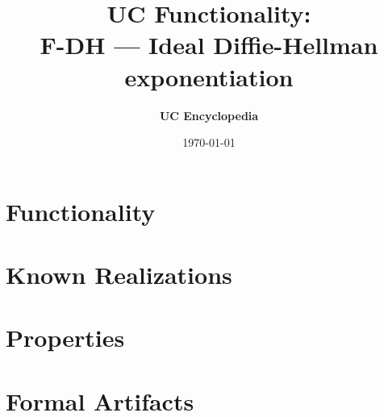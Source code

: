 \documentclass[11pt,a4paper]{article}
\title{\textbf{\Large UC Functionality:}\\[0.2em] \Large F-DH --- Ideal Diffie-Hellman exponentiation}
\author{\textbf{UC Encyclopedia}}
\date{\today}
\newtheorem{functionality}{Functionality}
\begin{document}
\maketitle

\begin{abstract}
\end{abstract}

\section{Functionality}

%

\section{Known Realizations}


\section{Properties}


\section{Formal Artifacts}

\end{document}
